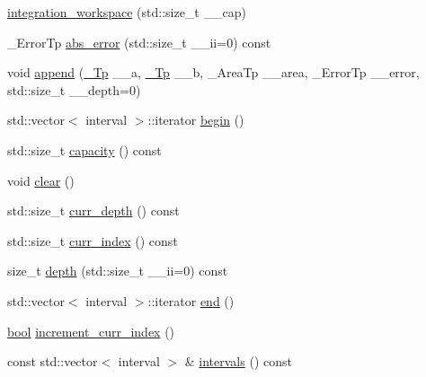 \begin{DoxyCompactItemize}
\item 
\hyperlink{class____gnu__cxx_1_1integration__workspace_a35a14f40924075a3ae17ff43626ef4e2}{integration\+\_\+workspace} (std\+::size\+\_\+t \+\_\+\+\_\+cap)
\item 
\+\_\+\+Error\+Tp \hyperlink{class____gnu__cxx_1_1integration__workspace_afccedf7d2f55c7e0b8c23d66f644bf05}{abs\+\_\+error} (std\+::size\+\_\+t \+\_\+\+\_\+ii=0) const
\item 
void \hyperlink{class____gnu__cxx_1_1integration__workspace_ac0faf5a81b8a6ac1519a9f2dd29d83e5}{append} (\hyperlink{namespace____gnu__cxx_a3b19a9c800ca194374ef9172290f7d79}{\+\_\+\+Tp} \+\_\+\+\_\+a, \hyperlink{namespace____gnu__cxx_a3b19a9c800ca194374ef9172290f7d79}{\+\_\+\+Tp} \+\_\+\+\_\+b, \+\_\+\+Area\+Tp \+\_\+\+\_\+area, \+\_\+\+Error\+Tp \+\_\+\+\_\+error, std\+::size\+\_\+t \+\_\+\+\_\+depth=0)
\item 
std\+::vector$<$ interval $>$\+::iterator \hyperlink{class____gnu__cxx_1_1integration__workspace_a9ecef94e75c1bc84e59300fe6504eed9}{begin} ()
\item 
std\+::size\+\_\+t \hyperlink{class____gnu__cxx_1_1integration__workspace_ab09606a7308122e0159e49df289d37af}{capacity} () const
\item 
void \hyperlink{class____gnu__cxx_1_1integration__workspace_a4e6791e8c8489b9cf5a0cf9f0e1a7fba}{clear} ()
\item 
std\+::size\+\_\+t \hyperlink{class____gnu__cxx_1_1integration__workspace_ad60321be84f0301856bf20f31ece47de}{curr\+\_\+depth} () const
\item 
std\+::size\+\_\+t \hyperlink{class____gnu__cxx_1_1integration__workspace_a51a384b1777615943add69f1895454f5}{curr\+\_\+index} () const
\item 
size\+\_\+t \hyperlink{class____gnu__cxx_1_1integration__workspace_ac5295379c8a8b07601cdc890fd0331a8}{depth} (std\+::size\+\_\+t \+\_\+\+\_\+ii=0) const
\item 
std\+::vector$<$ interval $>$\+::iterator \hyperlink{class____gnu__cxx_1_1integration__workspace_a0494e3b36de996e0a85552aaaac11c03}{end} ()
\item 
\hyperlink{namespace____gnu__cxx_ae83aca57f97767d5d09188718728a0ac}{bool} \hyperlink{class____gnu__cxx_1_1integration__workspace_a4ef93ec6c764386c714eefd9d6e75534}{increment\+\_\+curr\+\_\+index} ()
\item 
const std\+::vector$<$ interval $>$ \& \hyperlink{class____gnu__cxx_1_1integration__workspace_a9616ad00b222b6ec8c17ffcce4098877}{intervals} () const

\end{DoxyCompactItemize}

